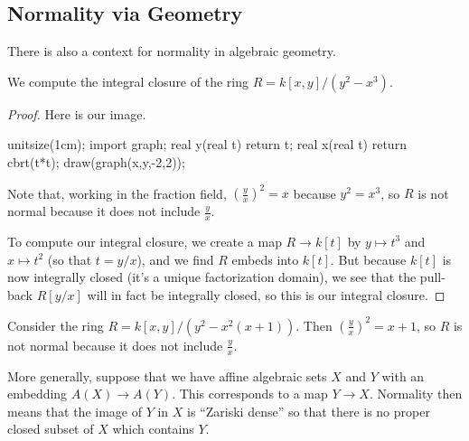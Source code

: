 \subsection{Normality via Geometry}
There is also a context for normality in algebraic geometry.
\begin{exe}
	We compute the integral closure of the ring $R=k[x,y]/\left(y^2-x^3\right)$.
\end{exe}
\begin{proof}
	Here is our image.
	\begin{center}
		\begin{asy}
			unitsize(1cm);
			import graph;
			real y(real t)
			{
				return t;
			}
			real x(real t)
			{
				return cbrt(t*t);
			}
			draw(graph(x,y,-2,2));
		\end{asy}
	\end{center}
	Note that, working in the fraction field, $\left(\frac yx\right)^2=x$ because $y^2=x^3$, so $R$ is not normal because it does not include $\frac yx$.

	To compute our integral closure, we create a map $R\to k[t]$ by $y\mapsto t^3$ and $x\mapsto t^2$ (so that $t=y/x$), and we find $R$ embeds into $k[t]$. But because $k[t]$ is now integrally closed (it's a unique factorization domain), we see that the pull-back $R[y/x]$ will in fact be integrally closed, so this is our integral closure.
\end{proof}
\begin{example}
	Consider the ring $R=k[x,y]/\left(y^2-x^2(x+1)\right)$. Then $\left(\frac yx\right)^2=x+1$, so $R$ is not normal because it does not include $\frac yx$.
\end{example}
More generally, suppose that we have affine algebraic sets $X$ and $Y$ with an embedding $A(X)\to A(Y)$. This corresponds to a map $Y\to X$. Normality then means that the image of $Y$ in $X$ is ``Zariski dense'' so that there is no proper closed subset of $X$ which contains $Y$.

